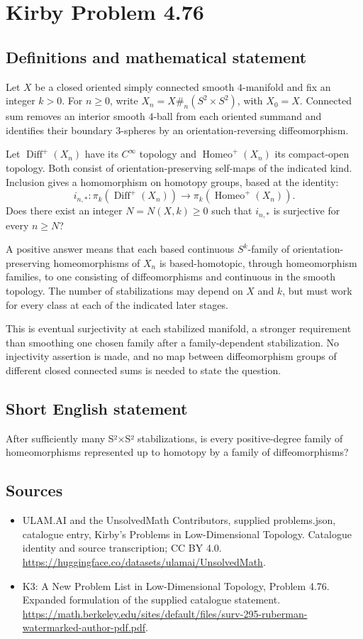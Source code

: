 \documentclass[11pt,a4paper]{article}
\begin{document}
\section*{Kirby Problem 4.76}\label{statement}

\subsection{Definitions and mathematical statement}
Let $X$ be a closed oriented simply connected smooth $4$-manifold
and fix an integer $k>0$. For $n\ge0$, write
$X_n=X\#_{n}(S^2\times S^2)$, with $X_0=X$.
Connected sum removes an interior smooth $4$-ball from each
oriented summand and identifies their boundary $3$-spheres by an
orientation-reversing diffeomorphism.

Let $\operatorname{Diff}^+(X_n)$ have its $C^\infty$ topology
and $\operatorname{Homeo}^+(X_n)$ its compact-open topology.
Both consist of orientation-preserving self-maps of the indicated
kind. Inclusion gives a homomorphism on homotopy groups, based
at the identity:
\[
 i_{n,*}:\pi_k(\operatorname{Diff}^+(X_n))
       \longrightarrow\pi_k(\operatorname{Homeo}^+(X_n)).
\]
Does there exist an integer $N=N(X,k)\ge0$ such that $i_{n,*}$
is surjective for every $n\ge N$?

A positive answer means that each based continuous $S^k$-family
of orientation-preserving homeomorphisms of $X_n$ is based-homotopic,
through homeomorphism families, to one consisting of diffeomorphisms
and continuous in the smooth topology. The number of stabilizations
may depend on $X$ and $k$, but must work for every class at each
of the indicated later stages.

This is eventual surjectivity at each stabilized manifold, a
stronger requirement than smoothing one chosen family after a
family-dependent stabilization. No injectivity assertion is made,
and no map between diffeomorphism groups of different closed
connected sums is needed to state the question.
\subsection{Short English statement}
After sufficiently many S²×S² stabilizations, is every positive-degree family of homeomorphisms represented up to homotopy by a family of diffeomorphisms?
\subsection{Sources}
\begin{itemize}
\item[S1] ULAM.AI and the UnsolvedMath Contributors, supplied problems.json, catalogue entry, Kirby's Problems in Low-Dimensional Topology. Catalogue identity and source transcription; CC BY 4.0.
\url{https://huggingface.co/datasets/ulamai/UnsolvedMath}.
\item[S2] K3: A New Problem List in Low-Dimensional Topology, Problem 4.76. Expanded formulation of the supplied catalogue statement.
\url{https://math.berkeley.edu/sites/default/files/surv-295-ruberman-watermarked-author-pdf.pdf}.
\end{itemize}
\end{document}
